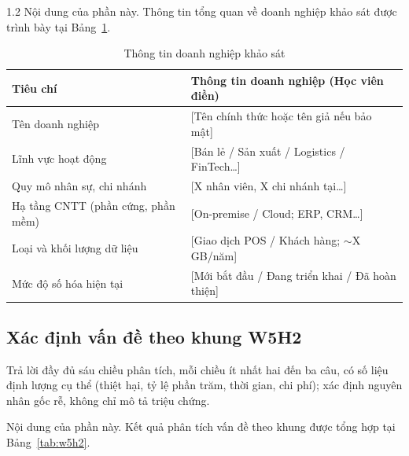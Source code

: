 \begin{spacing}{1.2}
Nội dung của phần này. Thông tin tổng quan về doanh nghiệp khảo sát được trình bày tại Bảng~\ref{tab:thong_tin_dn}.

\begin{table}[htpb]
\centering
\caption{Thông tin doanh nghiệp khảo sát}
\label{tab:thong_tin_dn}
\renewcommand{\arraystretch}{1.3}
{\fontsize{12}{14}\selectfont
\begin{tabularx}{\textwidth}{|>{\raggedright\arraybackslash}p{5cm}|X|}
\hline
\textbf{Tiêu chí} & \textbf{Thông tin doanh nghiệp (Học viên điền)} \\
\hline
Tên doanh nghiệp & [Tên chính thức hoặc tên giả nếu bảo mật] \\
\hline
Lĩnh vực hoạt động & [Bán lẻ / Sản xuất / Logistics / FinTech\ldots] \\
\hline
Quy mô nhân sự, chi nhánh & [X nhân viên, X chi nhánh tại\ldots] \\
\hline
Hạ tầng CNTT (phần cứng, phần mềm) & [On-premise / Cloud; ERP, CRM\ldots] \\
\hline
Loại và khối lượng dữ liệu & [Giao dịch POS / Khách hàng; $\sim$X GB/năm] \\
\hline
Mức độ số hóa hiện tại & [Mới bắt đầu / Đang triển khai / Đã hoàn thiện] \\
\hline
\end{tabularx}
}
\end{table}

\subsection{Xác định vấn đề theo khung W5H2}
\label{subsec:w5h2}

\begin{huongdan}
Trả lời đầy đủ sáu chiều phân tích, mỗi chiều ít nhất hai đến ba câu, có số liệu định lượng cụ thể (thiệt hại, tỷ lệ phần trăm, thời gian, chi phí); xác định nguyên nhân gốc rễ, không chỉ mô tả triệu chứng.
\end{huongdan}

Nội dung của phần này. Kết quả phân tích vấn đề theo khung  được tổng hợp tại Bảng~\ref{tab:w5h2}.


\end{spacing}

